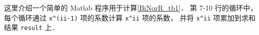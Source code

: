 

这里介绍一个简单的 Matlab 程序用于计算\autoref{BiNorR_tb1}． 第 7-10 行的循环中， 每个循环通过 \texttt{x\^{}(ii-1)} 项的系数计算 \texttt{x\^{}ii} 项的系数， 并将 \texttt{x\^{}ii} 项累加到求和结果 \texttt{result} 上．

